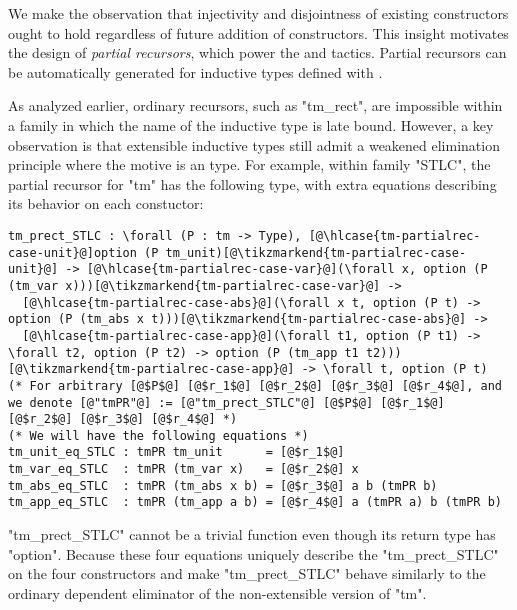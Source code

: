 
We make the observation
that injectivity and disjointness of existing constructors ought to hold
regardless of future addition of constructors.
%
This insight motivates the design of \emph{partial recursors}, which
power the  and  tactics.
Partial recursors can be automatically generated for inductive types
defined with .

As analyzed earlier, ordinary recursors, such as "tm_rect", are impossible
within a family in which the name of the inductive type is late bound.
However,
a key observation is that extensible inductive types still admit a
weakened elimination principle where the motive is an  type.
For example, within family "STLC", the partial recursor for
"tm" has the following type, with extra equations describing
its behavior on each constuctor:

\begin{centered}
\begin{minipage}{\textwidth}
\newcommand\hlcase[1]{\tikzmarkin[disable rounded corners=true,set fill color=yellow!18,set border color=yellow!18]{#1}(0.00,-0.05)(-0.00,0.20)}
\begin{lstlisting}[basicstyle=\fontsize{8.25}{9.9}\ttfamily]
tm_prect_STLC : \forall (P : tm -> Type), [@\hlcase{tm-partialrec-case-unit}@]option (P tm_unit)[@\tikzmarkend{tm-partialrec-case-unit}@] -> [@\hlcase{tm-partialrec-case-var}@](\forall x, option (P (tm_var x)))[@\tikzmarkend{tm-partialrec-case-var}@] ->
  [@\hlcase{tm-partialrec-case-abs}@](\forall x t, option (P t) -> option (P (tm_abs x t)))[@\tikzmarkend{tm-partialrec-case-abs}@] ->
  [@\hlcase{tm-partialrec-case-app}@](\forall t1, option (P t1) -> \forall t2, option (P t2) -> option (P (tm_app t1 t2)))[@\tikzmarkend{tm-partialrec-case-app}@] -> \forall t, option (P t)
(* For arbitrary [@$P$@] [@$r_1$@] [@$r_2$@] [@$r_3$@] [@$r_4$@], and we denote [@"tmPR"@] := [@"tm_prect_STLC"@] [@$P$@] [@$r_1$@] [@$r_2$@] [@$r_3$@] [@$r_4$@] *)
(* We will have the following equations *)
tm_unit_eq_STLC : tmPR tm_unit      = [@$r_1$@]
tm_var_eq_STLC  : tmPR (tm_var x)   = [@$r_2$@] x
tm_abs_eq_STLC  : tmPR (tm_abs x b) = [@$r_3$@] a b (tmPR b)
tm_app_eq_STLC  : tmPR (tm_app a b) = [@$r_4$@] a (tmPR a) b (tmPR b)
\end{lstlisting}
\end{minipage}
\end{centered}

"tm_prect_STLC" cannot be a trivial function even though its return type has "option". Because these four equations uniquely describe the "tm_prect_STLC" on the four constructors and make "tm_prect_STLC" behave similarly to the ordinary dependent eliminator of the non-extensible version of "tm". 

